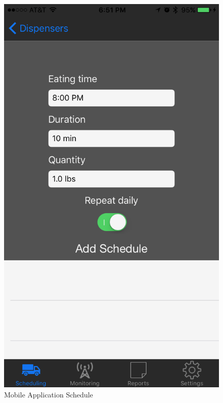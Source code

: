 \documentclass[12pt]{article}
\begin{document}
\begin{appendix}
  \begin{figure}[!htb]
    \begin{center}
        \includegraphics[scale=0.15]{Figures/iOSApp2.png}
    \end{center}
    \caption{Mobile Application Schedule}
    \label{fig:iOSApp2}
  \end{figure}


\end{appendix}
\end{document}
